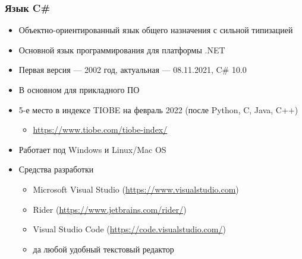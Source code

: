 \documentclass[xetex,mathserif,serif]{beamer}
\begin{document}
    \begin{frame}
        \frametitle{Язык C\#}
        \begin{itemize}
            \item Объектно-ориентированный язык общего назначения с сильной типизацией
            \item Основной язык программирования для платформы .NET
            \item Первая версия --- 2002 год, актуальная --- 08.11.2021, C\# 10.0
            \item В основном для прикладного ПО
            \item 5-е место в индексе TIOBE на февраль 2022 (после Python, C, Java, C++)
            \begin{itemize}
                \item \url{https://www.tiobe.com/tiobe-index/}
            \end{itemize}
            \item Работает под Windows и Linux/Mac OS
            \item Средства разработки
            \begin{itemize}
                \item Microsoft Visual Studio (\url{https://www.visualstudio.com})
                \item Rider (\url{https://www.jetbrains.com/rider/})
                \item Visual Studio Code (\url{https://code.visualstudio.com/})
                \item да любой удобный текстовый редактор
            \end{itemize}
        \end{itemize}
    \end{frame}
\end{document}
